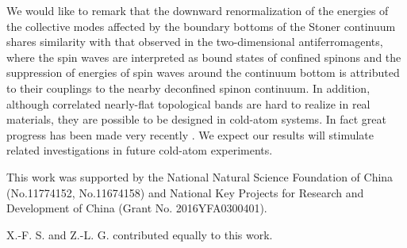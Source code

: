 \documentclass[amsmath,superscriptaddress,showpacs,aps,prb,twocolumn]{revtex4-1}
\begin{document}
\par We would like to remark that the downward renormalization of the energies of the collective modes affected by the boundary bottoms of the Stoner continuum shares similarity with that observed in the two-dimensional antiferromagents, where the spin waves are interpreted as bound states of confined spinons and the suppression of energies of spin waves around the continuum bottom is attributed to their couplings to the nearby deconfined spinon continuum\cite{ZFSMC_PRL2006,TS_PRL2013,DMCNTPEMIR_NP2015,SQCCMS_PRX2017,YWDYL_PRB2018}. In addition, although correlated nearly-flat topological bands are hard to realize in real materials, they are possible to be designed in cold-atom systems. In fact great progress has been made very recently \cite{LCJPS_N2009,AALBPB_PRL2013,MSKBK_PRL2013,JMDLUGE_N2014}. We expect our results will stimulate related investigations in future cold-atom experiments.

\begin{acknowledgments}
\par This work was supported by the National Natural Science Foundation of China (No.11774152, No.11674158) and National Key Projects for Research and Development of China (Grant No. 2016YFA0300401).
\par X.-F. S. and Z.-L. G. contributed equally to this work.
\end{acknowledgments}


\end{document}
